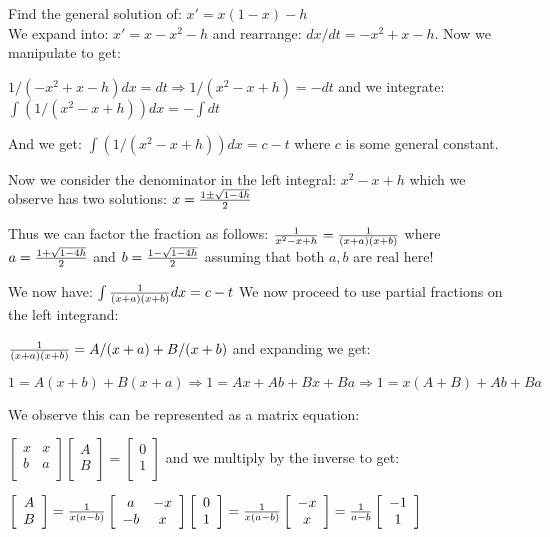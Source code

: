 \documentclass[11pt,letterpaper]{article}
\author{Vance Turnewitsch}
\begin{document}
Find the general solution of: $x'=x(1-x)-h$\\

We expand into: $x'=x-x^2-h$ and rearrange: $dx/dt=-x^2+x-h$. Now we manipulate to get:

$1/(-x^2+x-h)dx = dt \Longrightarrow 1/(x^2-x+h)=-dt$ and we integrate: $\int(1/(x^2-x+h))dx=-\int dt$

And we get: $\int(1/(x^2-x+h))dx=c-t$ where $c$ is some general constant.

Now we consider the denominator in the left integral: $x^2-x+h$ which we observe has two solutions: $x={1\pm\sqrt{1-4h}\over 2}$ 

Thus we can factor the fraction as follows: ${1\over x^2-x+h}={1\over (x+a)(x+b)}$ where $a={1+\sqrt{1-4h}\over 2}$ and $b={1-\sqrt{1-4h}\over 2}$ assuming that both $a,b$ are real here!


We now have: $\int{1\over (x+a)(x+b)}dx=c-t$ We now proceed to use partial fractions on the left integrand:

${1\over (x+a)(x+b)}=A/(x+a) + B/(x+b)$ and expanding we get:

$1 = A(x+b) + B(x+a) \Longrightarrow 1=Ax+Ab + Bx+Ba \Longrightarrow 1=x(A+B) + Ab + Ba$

We observe this can be represented as a matrix equation:

$\left[\begin{array}{ccc}
x & x \\
b & a \\
\end{array}\right]
\left[\begin{array}{c}
A\\
B\\\end{array}\right]=
\left[\begin{array}{c}
0 \\
1 \\
\end{array}\right]
$  and we multiply by the inverse to get:


$\left[\begin{array}{c}
A\\
B\\\end{array}\right]={1\over x(a-b)}
\left[\begin{array}{cc}
a & -x \\
-b & x \\
\end{array}\right]
\left[\begin{array}{c}
0 \\
1 \\
\end{array}\right]=
{1\over x(a-b)}
\left[\begin{array}{c}
-x \\
x \\
\end{array}\right]=
{1\over a-b}
\left[\begin{array}{c}
-1 \\
1 \\
\end{array}\right]
$
\end{document}
